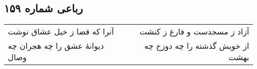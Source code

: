 \begin{center}
\section*{رباعی شماره ۱۵۹}
\label{sec:sh159}
\begin{longtable}{l p{0.5cm} r}
آنرا که قضا ز خیل عشاق نوشت
&&
آزاد ز مسجدست و فارغ ز کنشت
\\
دیوانهٔ عشق را چه هجران چه وصال
&&
از خویش گذشته را چه دوزخ چه بهشت
\\
\end{longtable}
\end{center}
